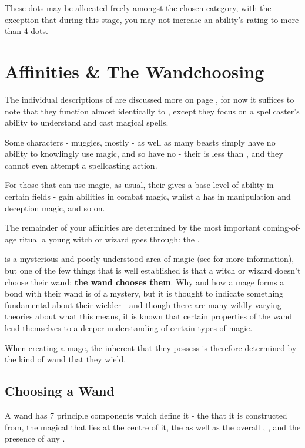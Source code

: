 These dots may be allocated freely amongst the chosen category, with the exception that during this stage, you may not increase an ability's rating to more than 4 dots. 


\section{Affinities \& The Wandchoosing} \label{S:Wandchoosing}

The individual descriptions of  are discussed more on page \pageref{S:DiscDescs}, for now it suffices to note that they function almost identically to , except they focus on a spellcaster's ability to understand and cast magical spells. 

Some characters - muggles, mostly - as well as many beasts simply have no ability to knowlingly use magic, and so have no  - their  is less than , and they cannot even attempt a spellcasting action. 

For those that can use magic, as usual, their  gives a base level of ability in certain fields -  gain abilities in combat magic, whilst a  has  in manipulation and deception magic, and so on. 

The remainder of your affinities are determined by the most important coming-of-age ritual a young witch or wizard goes through: the . 

 is a mysterious and poorly understood area of magic (see \pageref{S:Wandlore} for more information), but one of the few things that is well established is that a witch or wizard doesn't choose their wand: {\bf the wand chooses them}. Why and how a mage forms a bond with their wand is of a mystery, but it is thought to indicate something fundamental about their wielder - and though there are many wildly varying theories about what this means, it is known that certain properties of the wand lend themselves to a deeper understanding of certain types of magic. 

When creating a mage, the inherent  that they possess is therefore determined by the kind of wand that they wield. 

\subsection{Choosing a Wand}

A wand has 7 principle components which define it - the  that it is constructed from, the magical  that lies at the centre of it, the  as well as the overall , ,  and the presence of any . 

